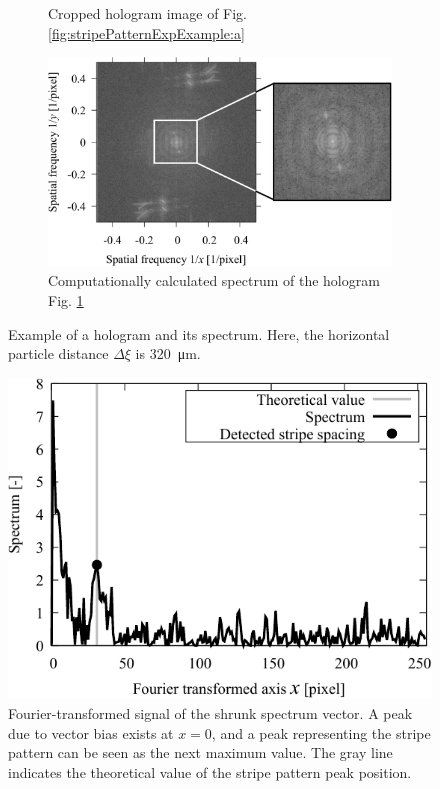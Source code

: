 \begin{figure}[H]
\begin{subfigure}[c]{0.45\linewidth}
        \caption{Cropped hologram image of Fig. \ref{fig:stripePatternExpExample:a}}
        \label{fig:stripePatternExpExample:b}
    \end{subfigure}

    \begin{subfigure}[b]{0.8\linewidth}
        \includegraphics[width=\linewidth]{./Figure/4_Results/stripe_pattern_experiment/recorded_data/c.pdf}
        \caption{Computationally calculated spectrum of the hologram Fig. \ref{fig:stripePatternExpExample:b}}
        \label{fig:stripePatternExpExample:c}
    \end{subfigure}

    \caption{Example of a hologram and its spectrum. Here, the horizontal particle distance $\Delta \xi$ is \SI{320}{\um}.} 
    \label{fig:stripePatternExpExample}
\end{figure}

\begin{figure}[H]
    \centering
    \includegraphics[width=0.75\linewidth]{./Figure/4_Results/stripe_pattern_experiment/stripe_pattern_exp_exam_peak.pdf}
    \caption{Fourier-transformed signal of the shrunk spectrum vector. A peak due to vector bias exists at $x=0$, and a peak representing the stripe pattern can be seen as the next maximum value. The gray line indicates the theoretical value of the stripe pattern peak position.}
    \label{fig:stripePatternFourierSignal}
\end{figure}


